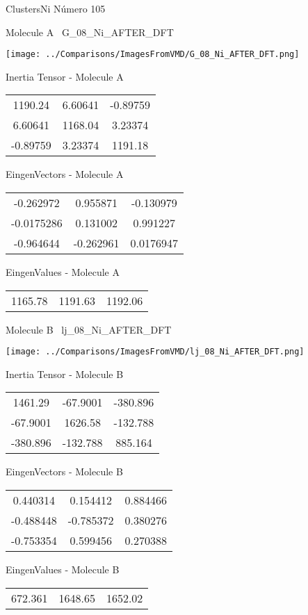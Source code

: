 \newpage

\vtab[-3cm]
\begin{center}
{\large ClustersNi \tab Número 105}
\end{center}
\begin{multicols}{2}
\begin{center}

Molecule A \
G\_08\_Ni\_AFTER\_DFT

\texttt{[image: ../Comparisons/ImagesFromVMD/G\_08\_Ni\_AFTER\_DFT.png]}

Inertia Tensor - Molecule A \\
\begin{tabular}{|c c c|}
1190.24	 & 	6.60641	 & 	-0.89759	 \\
6.60641	 & 	1168.04	 & 	3.23374	 \\
-0.89759	 & 	3.23374	 & 	1191.18
\end{tabular}

\vtab
 EingenVectors - Molecule A     \\
\begin{tabular}{|c c c|}
-0.262972	 & 	0.955871	 & 	-0.130979	 \\
-0.0175286	 & 	0.131002	 & 	0.991227	 \\
-0.964644	 & 	-0.262961	 & 	0.0176947
\end{tabular}

\vtab
 EingenValues - Molecule A     \\
\begin{tabular}{|c c c|}
1165.78	 & 	1191.63	 & 	1192.06	 \\
\end{tabular}
\columnbreak

Molecule B \
lj\_08\_Ni\_AFTER\_DFT

\texttt{[image: ../Comparisons/ImagesFromVMD/lj\_08\_Ni\_AFTER\_DFT.png]}

Inertia Tensor - Molecule B \\
\begin{tabular}{|c c c|}
1461.29	 & 	-67.9001	 & 	-380.896	 \\
-67.9001	 & 	1626.58	 & 	-132.788	 \\
-380.896	 & 	-132.788	 & 	885.164
\end{tabular}

\vtab
 EingenVectors - Molecule B     \\
\begin{tabular}{|c c c|}
0.440314	 & 	0.154412	 & 	0.884466	 \\
-0.488448	 & 	-0.785372	 & 	0.380276	 \\
-0.753354	 & 	0.599456	 & 	0.270388
\end{tabular}

\vtab
 EingenValues - Molecule B     \\
\begin{tabular}{|c c c|}
672.361	 & 	1648.65	 & 	1652.02	 \\
\end{tabular}

\end{center}
\end{multicols}

